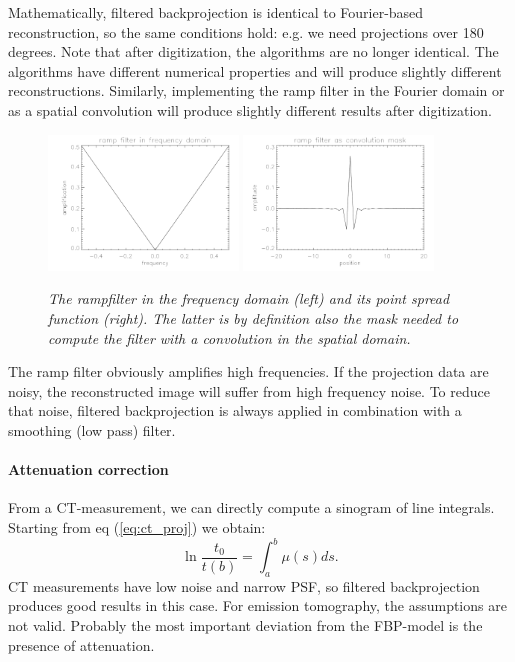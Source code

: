 \documentclass[11pt,oneside]{article}
\begin{document}
Mathematically, filtered backprojection is identical to Fourier-based
reconstruction, so the same conditions hold: e.g. we need projections over 180
degrees. Note that after digitization, the algorithms are no longer identical.
The algorithms have different numerical properties and will produce slightly
different reconstructions. Similarly, implementing the ramp filter in the
Fourier domain or as a spatial convolution will produce slightly different
results after digitization. 
%
\begin{figure}[tb]
  \includegraphics[width=0.45\textwidth]{figs/fig_rampfilter1.pdf}
  \includegraphics[width=0.45\textwidth]{figs/fig_rampfilter2.pdf}
\caption{\label{fig:rampfilter} \emph{The rampfilter in the frequency
    domain (left) and its point spread function (right). The latter is
    by definition also the mask needed to compute the filter with a
    convolution in the spatial domain.}}
\end{figure}

The ramp filter obviously amplifies high frequencies. If the
projection data are noisy, the reconstructed image will suffer from
high frequency noise. To reduce that noise, filtered backprojection is
always applied in combination with a smoothing (low pass) filter.

\paragraph{Attenuation correction} \label{sec:attencor}
From a CT-measurement, we can directly compute a sinogram of line integrals.
Starting from eq (\ref{eq:ct_proj}) we obtain:
\begin{equation}
  \ln \frac{t_0}{t(b)} = \int_a^b \mu(s) ds. \label{eq:attencor}
\end{equation}
CT measurements have low noise and narrow PSF, so filtered backprojection
produces good results in this case. For emission tomography, the assumptions
are not valid. Probably the most important deviation from the FBP-model is the
presence of attenuation.
\end{document}
